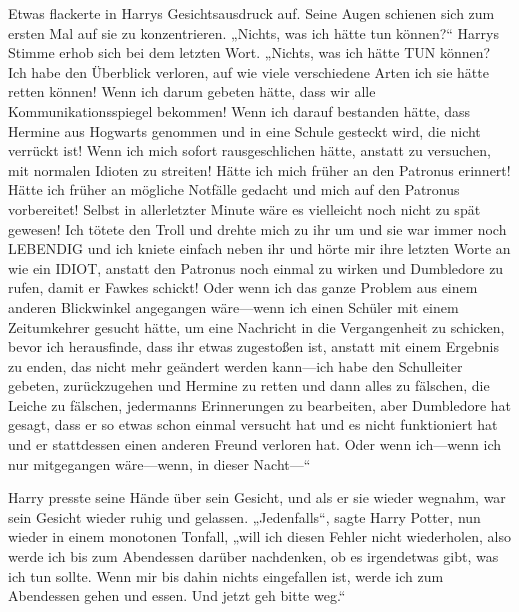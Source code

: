 Etwas flackerte in Harrys Gesichtsausdruck auf. Seine Augen schienen sich zum ersten Mal auf sie zu konzentrieren. „Nichts, was ich hätte tun können?“ Harrys Stimme erhob sich bei dem letzten Wort. „Nichts, was ich hätte TUN können? Ich habe den Überblick verloren, auf wie viele verschiedene Arten ich sie hätte retten können! Wenn ich darum gebeten hätte, dass wir alle Kommunikationsspiegel bekommen! Wenn ich darauf bestanden hätte, dass Hermine aus Hogwarts genommen und in eine Schule gesteckt wird, die nicht verrückt ist! Wenn ich mich sofort rausgeschlichen hätte, anstatt zu versuchen, mit normalen Idioten zu streiten! Hätte ich mich früher an den Patronus erinnert! Hätte ich früher an mögliche Notfälle gedacht und mich auf den Patronus vorbereitet! Selbst in allerletzter Minute wäre es vielleicht noch nicht zu spät gewesen! Ich tötete den Troll und drehte mich zu ihr um und sie war immer noch LEBENDIG und ich kniete einfach neben ihr und hörte mir ihre letzten Worte an wie ein IDIOT, anstatt den Patronus noch einmal zu wirken und Dumbledore zu rufen, damit er Fawkes schickt! Oder wenn ich das ganze Problem aus einem anderen Blickwinkel angegangen wäre—wenn ich einen Schüler mit einem Zeitumkehrer gesucht hätte, um eine Nachricht in die Vergangenheit zu schicken, bevor ich herausfinde, dass ihr etwas zugestoßen ist, anstatt mit einem Ergebnis zu enden, das nicht mehr geändert werden kann—ich habe den Schulleiter gebeten, zurückzugehen und Hermine zu retten und dann alles zu fälschen, die Leiche zu fälschen, jedermanns Erinnerungen zu bearbeiten, aber Dumbledore hat gesagt, dass er so etwas schon einmal versucht hat und es nicht funktioniert hat und er stattdessen einen anderen Freund verloren hat. Oder wenn ich—wenn ich nur mitgegangen wäre—wenn, in dieser Nacht—“


Harry presste seine Hände über sein Gesicht, und als er sie wieder wegnahm, war sein Gesicht wieder ruhig und gelassen. „Jedenfalls“, sagte Harry Potter, nun wieder in einem monotonen Tonfall, „will ich diesen Fehler nicht wiederholen, also werde ich bis zum Abendessen darüber nachdenken, ob es irgendetwas gibt, was ich tun sollte. Wenn mir bis dahin nichts eingefallen ist, werde ich zum Abendessen gehen und essen. Und jetzt geh bitte weg.“

